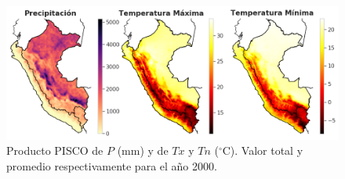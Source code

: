 \begin{figure}[ht]
	\includegraphics[width=16cm]{Images/00_PISCOproducts.png}
	\centering
	\caption{Producto PISCO de $P$ (mm) y de $Tx$ y $Tn$ ($^{\circ}$C). Valor total y promedio respectivamente para el año 2000.}
	\label{fig:00_PISCOproducts}
\end{figure}